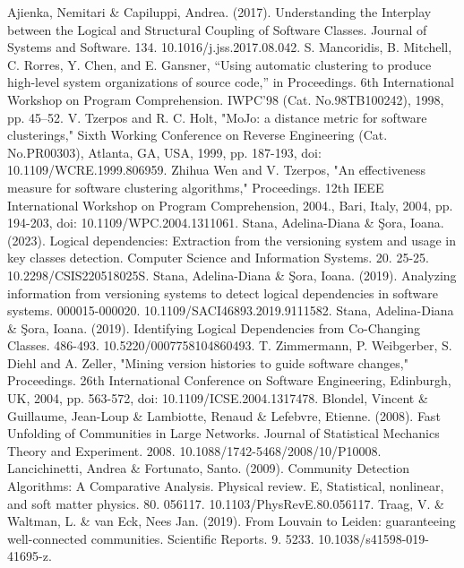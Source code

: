 \documentclass{ieeeaccess}
\begin{document}
\begin{thebibliography}{00}

 Ajienka, Nemitari \& Capiluppi, Andrea. (2017). Understanding the Interplay between the Logical and Structural Coupling of Software Classes. Journal of Systems and Software. 134. 10.1016/j.jss.2017.08.042.
 S. Mancoridis, B. Mitchell, C. Rorres, Y. Chen, and E. Gansner, “Using automatic clustering to produce high-level system organizations of source code,” in Proceedings. 6th International Workshop on Program Comprehension. IWPC’98 (Cat. No.98TB100242), 1998, pp. 45–52.
 V. Tzerpos and R. C. Holt, "MoJo: a distance metric for software clusterings," Sixth Working Conference on Reverse Engineering (Cat. No.PR00303), Atlanta, GA, USA, 1999, pp. 187-193, doi: 10.1109/WCRE.1999.806959.
 Zhihua Wen and V. Tzerpos, "An effectiveness measure for software clustering algorithms," Proceedings. 12th IEEE International Workshop on Program Comprehension, 2004., Bari, Italy, 2004, pp. 194-203, doi: 10.1109/WPC.2004.1311061.
 Stana, Adelina-Diana \& Şora, Ioana. (2023). Logical dependencies: Extraction from the versioning system and usage in key classes detection. Computer Science and Information Systems. 20. 25-25. 10.2298/CSIS220518025S. 
 Stana, Adelina-Diana \& Şora, Ioana. (2019). Analyzing information from versioning systems to detect logical dependencies in software systems. 000015-000020. 10.1109/SACI46893.2019.9111582. 
 Stana, Adelina-Diana \& Şora, Ioana. (2019). Identifying Logical Dependencies from Co-Changing Classes. 486-493. 10.5220/0007758104860493. 
 T. Zimmermann, P. Weibgerber, S. Diehl and A. Zeller, "Mining version histories to guide software changes," Proceedings. 26th International Conference on Software Engineering, Edinburgh, UK, 2004, pp. 563-572, doi: 10.1109/ICSE.2004.1317478.
 Blondel, Vincent \& Guillaume, Jean-Loup \& Lambiotte, Renaud \& Lefebvre, Etienne. (2008). Fast Unfolding of Communities in Large Networks. Journal of Statistical Mechanics Theory and Experiment. 2008. 10.1088/1742-5468/2008/10/P10008. 
 Lancichinetti, Andrea \& Fortunato, Santo. (2009). Community Detection Algorithms: A Comparative Analysis. Physical review. E, Statistical, nonlinear, and soft matter physics. 80. 056117. 10.1103/PhysRevE.80.056117. 
 Traag, V. \& Waltman, L. \& van Eck, Nees Jan. (2019). From Louvain to Leiden: guaranteeing well-connected communities. Scientific Reports. 9. 5233. 10.1038/s41598-019-41695-z. 

\end{thebibliography}
\end{document}
